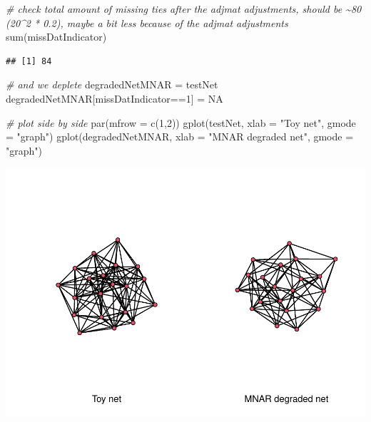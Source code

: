 \documentclass[
]{article}
\newenvironment{Shaded}{\begin{snugshade}}{\end{snugshade}}
\newcommand{\AttributeTok}[1]{\textcolor[rgb]{0.77,0.63,0.00}{#1}}
\newcommand{\CommentTok}[1]{\textcolor[rgb]{0.56,0.35,0.01}{\textit{#1}}}
\newcommand{\ConstantTok}[1]{\textcolor[rgb]{0.00,0.00,0.00}{#1}}
\newcommand{\DecValTok}[1]{\textcolor[rgb]{0.00,0.00,0.81}{#1}}
\newcommand{\FunctionTok}[1]{\textcolor[rgb]{0.00,0.00,0.00}{#1}}
\newcommand{\NormalTok}[1]{#1}
\newcommand{\OtherTok}[1]{\textcolor[rgb]{0.56,0.35,0.01}{#1}}
\newcommand{\SpecialCharTok}[1]{\textcolor[rgb]{0.00,0.00,0.00}{#1}}
\newcommand{\StringTok}[1]{\textcolor[rgb]{0.31,0.60,0.02}{#1}}
\begin{document}
\begin{Shaded}
\begin{Highlighting}[]
\CommentTok{\# check total amount of missing ties after the adjmat adjustments, should be \textasciitilde{}80 (20\^{}2 * 0.2), maybe a bit less because of the adjmat adjustments}
\FunctionTok{sum}\NormalTok{(missDatIndicator)}
\end{Highlighting}
\end{Shaded}

\begin{verbatim}
## [1] 84
\end{verbatim}

\begin{Shaded}
\begin{Highlighting}[]
\CommentTok{\# and we deplete}
\NormalTok{degradedNetMNAR }\OtherTok{=}\NormalTok{ testNet}
\NormalTok{degradedNetMNAR[missDatIndicator}\SpecialCharTok{==}\DecValTok{1}\NormalTok{] }\OtherTok{=} \ConstantTok{NA}

\CommentTok{\# plot side by side}
\FunctionTok{par}\NormalTok{(}\AttributeTok{mfrow =} \FunctionTok{c}\NormalTok{(}\DecValTok{1}\NormalTok{,}\DecValTok{2}\NormalTok{))}
\FunctionTok{gplot}\NormalTok{(testNet, }\AttributeTok{xlab =} \StringTok{"Toy net"}\NormalTok{, }\AttributeTok{gmode =} \StringTok{"graph"}\NormalTok{)}
\FunctionTok{gplot}\NormalTok{(degradedNetMNAR, }\AttributeTok{xlab =} \StringTok{"MNAR degraded net"}\NormalTok{, }\AttributeTok{gmode =} \StringTok{"graph"}\NormalTok{)}
\end{Highlighting}
\end{Shaded}

\includegraphics{20220404_miss_data_model_files/figure-latex/MNAR netdegrade-1.pdf}
\end{document}
